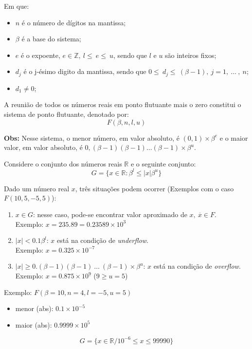 \documentclass[a4paper,oneside,article,table]{article}
\begin{document}
        Em que:
        \begin{itemize}[leftmargin=+0.5in]
            \item $n$ é o número de dígitos na mantissa;
            \item $\beta$ é a base do sistema;
            \item $e$ é o expoente, $e \in \mathbb{Z},~l\leq~e\leq~u$, sendo que $l$ e $u$ são inteiros fixos;
            \item $d_j$ é o j-ésimo digito da mantissa, sendo que $0\leq~d_j\leq~(\beta - 1),~j = 1,~\ldots~,~n$;
            \item $d_1 \neq 0$;
        \end{itemize}

    A reunião de todos os números reais em ponto flutuante mais o zero constitui o sistema de ponto flutuante, denotado por:
    \[F(\beta, n, l, u)\]

    
    \textbf{Obs:} Nesse sistema, o menor número, em valor absoluto, é $(0,1)\times\beta^e$ e o maior valor, em valor absoluto, é $0,(\beta-1)(\beta-1)\ldots(\beta-1)\times\beta^u$.\\ %

    \newpage

    Considere o conjunto dos números reais $\mathbb{R}$ e o seguinte conjunto:
    \[G = \{x \in \mathbb{R} : {\beta}^l \leq |x| {\beta}^u\}\]

    Dado um número real $x$, três situações podem ocorrer (Exemplos com o caso $F(10, 5, -5, 5)$):

    \begin{enumerate}
            \item $x \in G$: nesse caso, pode-se encontrar valor aproximado de $x,~\overline{x} \in F$.\\
                Exemplo: $x = 235.89 = 0.23589 \times 10^3$
            \item $|x| < 0.1\beta^l$: $x$ está na condição de \textit{underflow}.\\
                Exemplo: $x = 0.325 \times 10^{-7}$
            \item $|x| \ge 0.(\beta-1)(\beta-1)~\ldots~(\beta-1) \times \beta^u$: $x$ está na condição de \textit{overflow}.\\
                Exemplo: $x = 0.875 \times 10^{\underline{9}}$ ($9 \ge u = 5$)
    \end{enumerate}

    Exemplo: $F(\beta = 10, n = 4, l = -5, u = 5)$
    \begin{itemize}[leftmargin=+0.5in]
            \item menor (abs): $0.1 \times 10^{-5}$
            \item maior (abs): $0.9999 \times 10^{5}$
    \end{itemize}
    \[G = \{x \in \mathbb{R} / 10^{-6} \leq x \leq 99990\}\]
\end{document}

